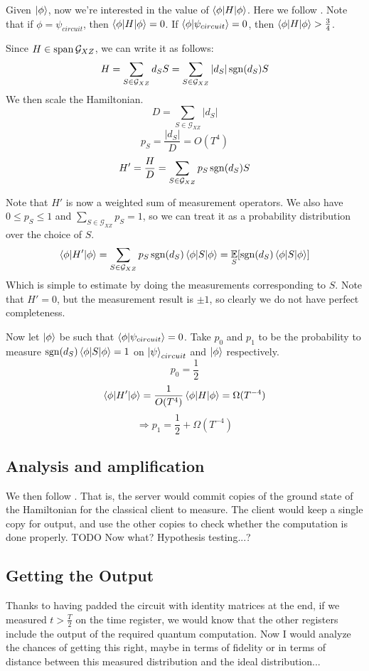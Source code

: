 Given $\ket\phi$, now we're interested in the value of $\braket{\phi|H|\phi}$. Here we follow \cite{PhysRevA.93.022326}. Note that if $\phi=\psi_{circuit}$, then $\braket{\phi|H|\phi}=0$. If $\braket{\phi|\psi_{circuit}}=0$, then $\braket{\phi|H|\phi}>\frac{3}{4}$.

Since $H\in\operatorname*{\operatorname{span}}\mathcal{G}_{XZ}$, we can write it as follows:
$$H=\sum_{S\in\mathcal{G}_{XZ}} d_S S= \sum_{S\in\mathcal{G}_{XZ}} |d_S|\operatorname{sgn}(d_S)S$$
We then scale the Hamiltonian.
$$D=\sum_{S\in\mathcal{G}_{XZ}}|d_S|$$
$$p_S=\frac{|d_S|}{D}=O(T^4)$$
$$H'=\frac{H}{D}=\sum_{S\in\mathcal{G}_{XZ}} p_S\operatorname{sgn}(d_S)S$$

Note that $H'$ is now a weighted sum of measurement operators. We also have $0\leq p_S\leq1$ and $\sum_{S\in\mathcal{G}_{XZ}} p_S=1$, so we can treat it as a probability distribution over the choice of $S$.
$$\braket{\phi|H'|\phi}=\sum_{S\in\mathcal{G}_{XZ}} p_S\operatorname{sgn}(d_S)\braket{\phi|S|\phi}=\operatorname*{\mathbb{E}}_S[\operatorname{sgn}(d_S)\braket{\phi|S|\phi}]$$
Which is simple to estimate by doing the measurements corresponding to $S$.
Note that $H'=0$, but the measurement result is $\pm1$, so clearly we do not have perfect completeness.

Now let $\ket\phi$ be such that $\braket{\phi|\psi_{circuit}}=0$.
Take $p_0$ and $p_1$ to be the probability to measure $\operatorname{sgn}(d_S)\braket{\phi|S|\phi}=1$ on $\ket\psi_{circuit}$ and $\ket\phi$ respectively.
$$p_0=\frac{1}{2}$$
$$\braket{\phi|H'|\phi}=\frac{1}{O(T^4)}\braket{\phi|H|\phi}=\Omega(T^{-4})$$
$$\Rightarrow p_1=\frac{1}{2}+\Omega(T^{-4})$$

\subsection{Analysis and amplification}

We then follow \cite{mahadev_delegation}. That is, the server would commit copies of the ground state of the Hamiltonian for the classical client to measure.
The client would keep a single copy for output, and use the other copies to check whether the computation is done properly.
TODO Now what? Hypothesis testing...?

\subsection{Getting the Output}

Thanks to having padded the circuit with identity matrices at the end, if we measured $t>\frac{T}{2}$ on the time register, we would know that the other registers include the output of the required quantum computation. Now I would analyze the chances of getting this right, maybe in terms of fidelity or in terms of distance between this measured distribution and the ideal distribution...
